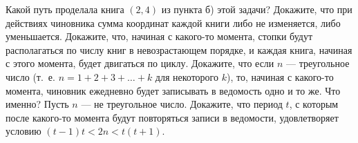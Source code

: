 \documentclass[a4paper,12pt]{article}
\begin{document}
 Какой путь проделала книга $(2,4)$ из пункта б) этой задачи?
 Докажите, что при действиях чиновника сумма координат
каждой книги либо не изменяется, либо уменьшается.
 Докажите, что, начиная с какого-то момента, стопки будут
располагаться по числу книг в невозрастающем порядке,
и каждая книга, начиная с этого момента, будет двигаться по циклу.
 Докажите, что если $n$ --- треугольное число (т.~е. $n=1+2+3+\ldots+k$ для некоторого $k$), то, начиная с какого-то момента,
чиновник ежедневно будет записывать в ведомость одно и то же.
Что именно?
 Пусть $n$ --- не треугольное число. Докажите, что период $t$, с которым
после какого-то момента будут повторяться записи в ведомости, удовлетворяет условию
$(t-1)t<2n<t(t+1).$






\end{document}
